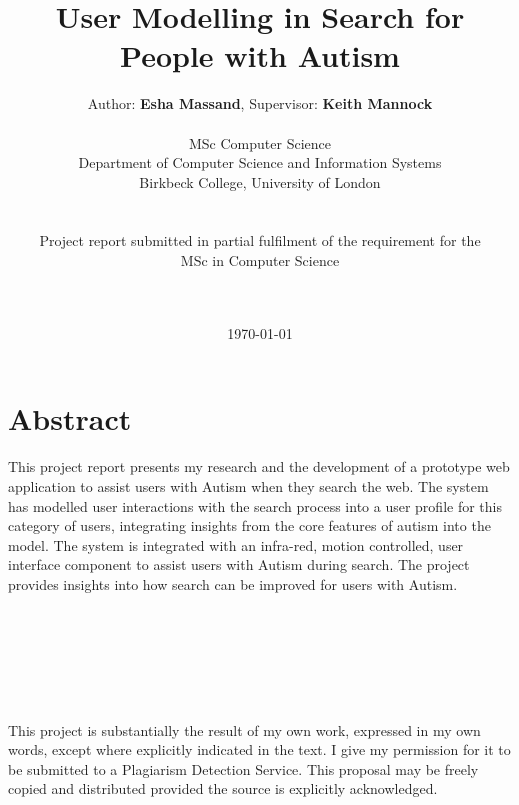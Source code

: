 \documentclass[a4paper, 11pt]{article}
\begin{document}
\LARGE\title{User Modelling in Search for People with Autism}

\LARGE\author{Author: \textbf{Esha Massand}, Supervisor: \textbf{Keith Mannock}\\
\\
MSc Computer Science\\Department of Computer Science and Information Systems\\Birkbeck College, University of London\\\\\\Project report submitted in partial fulfilment of the requirement for the \\MSc in Computer Science\date{\mydate\today}
\\\
}

\normalsize


\maketitle


\section*{Abstract}
\begin{justify}
This project report presents my research and the development of a prototype web application to assist users with Autism when they search the web. The system has modelled user interactions with the search process into a user profile for this category of users, integrating insights from the core features of autism into the model. The system is integrated with an infra-red, motion controlled, user interface component to assist users with Autism during search. The project provides insights into how search can be improved for users with Autism.\\
\end{justify}
\begin{verbatim}






\end{verbatim}

\begin{justify}
This project is substantially the result of my own work, expressed in my own words, except where explicitly indicated in the text. I give my permission for it to be submitted to a Plagiarism Detection Service. This proposal may be freely copied and distributed provided the source is explicitly acknowledged.
\end{justify}
\end{document}

